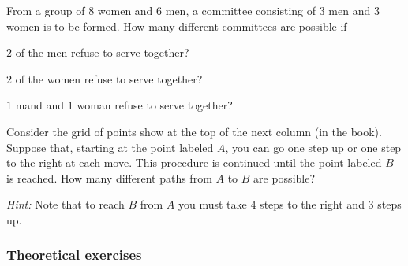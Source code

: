 \begin{problem}[Ross, \S 1, \# 19]
  From a group of \(8\) women and \(6\) men, a committee consisting of
  \(3\) men and \(3\) women is to be formed. How many different committees
  are possible if
  \begin{alphlist}
  \item \(2\) of the men refuse to serve together?
  \item \(2\) of the women refuse to serve together?
  \item \(1\) mand and \(1\) woman refuse to serve together?
  \end{alphlist}
\end{problem}
\begin{solution*}
\end{solution*}

\begin{problem}[Ross, \S 1, \# 21]
  Consider the grid of points show at the top of the next column (in the
  book). Suppose that, starting at the point labeled \(A\), you can go one
  step up or one step to the right at each move. This procedure is
  continued until the point labeled \(B\) is reached. How many different
  paths from \(A\) to \(B\) are possible?

  \noindent\emph{Hint:} Note that to reach \(B\) from \(A\) you must take
  \(4\) steps to the right and \(3\) steps up.
\end{problem}
\begin{solution*}
\end{solution*}

\begin{problem}[Ross, \S 1, \# 22]
\end{problem}
\begin{solution*}
\end{solution*}

\begin{problem}[Ross, \S 1, \# 33]
\end{problem}
\begin{solution*}
\end{solution*}

\subsubsection{Theoretical exercises}
\begin{problem}[Ross, \S 1, \# 5]
\end{problem}
\begin{solution*}
\end{solution*}

